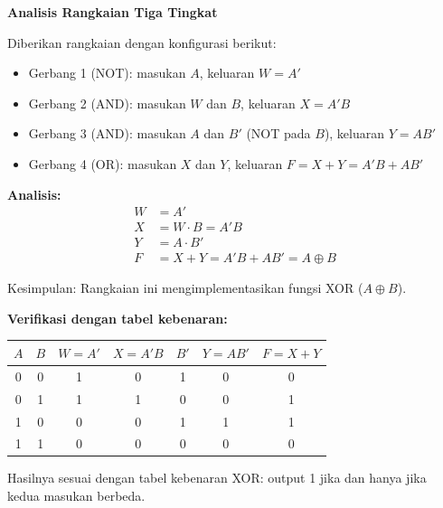 \begin{contoh}
\textbf{Analisis Rangkaian Tiga Tingkat}

Diberikan rangkaian dengan konfigurasi berikut:
\begin{itemize}
    \item Gerbang 1 (NOT): masukan $A$, keluaran $W = A'$
    \item Gerbang 2 (AND): masukan $W$ dan $B$, keluaran $X = A'B$
    \item Gerbang 3 (AND): masukan $A$ dan $B'$ (NOT pada $B$), keluaran $Y = AB'$
    \item Gerbang 4 (OR): masukan $X$ dan $Y$, keluaran $F = X + Y = A'B + AB'$
\end{itemize}

\textbf{Analisis:}
\begin{align*}
W &= A' \\
X &= W \cdot B = A'B \\
Y &= A \cdot B' \\
F &= X + Y = A'B + AB' = A \oplus B
\end{align*}

Kesimpulan: Rangkaian ini mengimplementasikan fungsi XOR ($A \oplus B$).

\textbf{Verifikasi dengan tabel kebenaran:}
\begin{center}
\renewcommand{\arraystretch}{1.2}
\begin{tabular}{|c|c||c|c|c|c||c|}
\hline
$A$ & $B$ & $W = A'$ & $X = A'B$ & $B'$ & $Y = AB'$ & $F = X + Y$ \\ \hline
0 & 0 & 1 & 0 & 1 & 0 & 0 \\ \hline
0 & 1 & 1 & 1 & 0 & 0 & 1 \\ \hline
1 & 0 & 0 & 0 & 1 & 1 & 1 \\ \hline
1 & 1 & 0 & 0 & 0 & 0 & 0 \\ \hline
\end{tabular}
\end{center}

Hasilnya sesuai dengan tabel kebenaran XOR: output 1 jika dan hanya jika kedua masukan berbeda.
\end{contoh}

